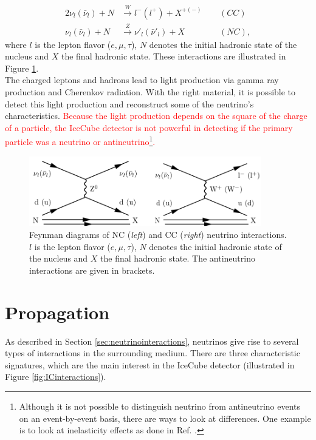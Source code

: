 \begin{alignat}{2}
\nu_l \left(\bar{\nu}_l\right) + N &\xrightarrow{W} l^- \left(l^+\right) + X^{+\left(-\right)} \ \ && \left(CC\right)\\
\nu_l \left(\bar{\nu}_l\right) + N &\xrightarrow{Z} \nu'_l \left(\bar{\nu}'_l\right) + X && \left(NC\right),
\end{alignat}
where $l$ is the lepton flavor ($e,\mu,\tau$), $N$ denotes the initial hadronic state of the nucleus and $X$ the final hadronic state. These interactions are illustrated in Figure \ref{fig:feynmanneutrino}.\\
\newline
The charged leptons and hadrons lead to light production via gamma ray production and Cherenkov radiation. With the right material, it is possible to detect this light production and reconstruct some of the neutrino's characteristics. \textcolor{red}{Because the light production depends on the square of the charge of a particle, the IceCube detector is not powerful in detecting if the primary particle was a neutrino or antineutrino\footnote{Although it is not possible to distinguish neutrino from antineutrino events on an event-by-event basis, there are ways to look at differences. One example is to look at inelasticity effects as done in Ref. \cite{Aartsen:2018vez}.}.}

\begin{figure}[t]
\centering
\includegraphics[width = 0.9\textwidth]{chapter4/img/feynmanneutrino.png}
\caption{Feynman diagrams of NC (\textit{left}) and CC (\textit{right}) neutrino interactions. $l$ is the lepton flavor ($e,\mu,\tau$), $N$ denotes the initial hadronic state of the nucleus and $X$ the final hadronic state. The antineutrino interactions are given in brackets.}
\label{fig:feynmanneutrino}
\end{figure}


\section{Propagation}
\label{sec:propagation}
As described in Section \ref{sec:neutrinointeractions}, neutrinos give rise to several types of interactions in the surrounding medium. There are three characteristic signatures, which are the main interest in the IceCube detector (illustrated in Figure \ref{fig:ICinteractions}).

